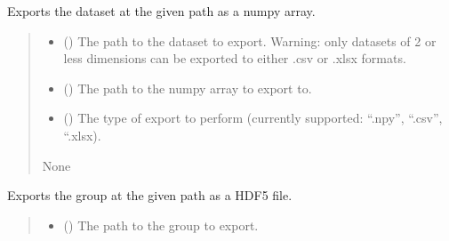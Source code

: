 \documentclass[letterpaper,10pt,english]{sphinxmanual}
\begin{document}
\begin{fulllineitems}
\begin{fulllineitems}
\label{\detokenize{_autosummary/HDF5_BLS.wrapper:HDF5_BLS.wrapper.Wrapper.export_dataset}}
\pysigstartsignatures
\pysiglinewithargsret
{}
{\sphinxparamcomma {}\sphinxparamcomma {}}
{}
\pysigstopsignatures
\sphinxAtStartPar
Exports the dataset at the given path as a numpy array.
\begin{quote}\begin{description}
\begin{itemize}
\item {} 
\sphinxAtStartPar
{} () \textendash{} The path to the dataset to export. Warning: only datasets of 2 or less dimensions can be exported to either .csv or .xlsx formats.

\item {} 
\sphinxAtStartPar
{} () \textendash{} The path to the numpy array to export to.

\item {} 
\sphinxAtStartPar
{} () \textendash{} The type of export to perform (currently supported: “.npy”, “.csv”, “.xlsx).

\end{itemize}

\sphinxAtStartPar
None

\end{description}\end{quote}

\end{fulllineitems}


\begin{fulllineitems}
\label{\detokenize{_autosummary/HDF5_BLS.wrapper:HDF5_BLS.wrapper.Wrapper.export_group}}
\pysigstartsignatures
\pysiglinewithargsret
{}
{\sphinxparamcomma {}\sphinxparamcomma {}}
{}
\pysigstopsignatures
\sphinxAtStartPar
Exports the group at the given path as a HDF5 file.
\begin{quote}\begin{description}
\begin{itemize}
\item {} 
\sphinxAtStartPar
{} () \textendash{} The path to the group to export.


\end{itemize}
\end{description}
\end{quote}
\end{fulllineitems}
\end{fulllineitems}
\end{document}
